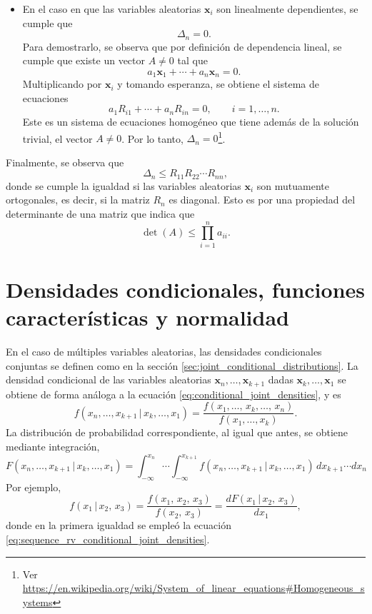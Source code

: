 \documentclass[a4paper]{report}
\newcommand{\x}{\mathbf{x}}
\begin{document}
\begin{itemize}
\begin{itemize}
  \item En el caso en que las variables aleatorias \(\x_i\) son linealmente dependientes, se cumple que
  \[
   \Delta_n=0.
  \]
  Para demostrarlo, se observa que por definición de dependencia lineal, se cumple que existe un vector \(A\neq0\) tal que
  \[
   a_1\x_1+\cdots+a_n\x_n=0.
  \]
  Multiplicando por \(\x_i\) y tomando esperanza, se obtiene el sistema de ecuaciones
  \[
   a_1R_{i1}+\cdots+a_nR_{in}=0,\qquad i=1,\dots,n.
  \]
  Este es un sistema de ecuaciones homogéneo que tiene además de la solución trivial, el vector \(A\neq0\). Por lo tanto, \(\Delta_n=0\)\footnote{Ver \url{https://en.wikipedia.org/wiki/System_of_linear_equations\#Homogeneous_systems}}. 
 \end{itemize}
\end{itemize}
Finalmente, se observa que
\[
 \Delta_n\leq R_{11}R_{22}\cdots R_{nn},
\]
donde se cumple la igualdad si las variables aleatorias \(\x_i\) son mutuamente ortogonales, es decir, si la matriz \(R_n\) es diagonal. Esto es por una propiedad del determinante de una matriz que indica que
\[
 \det(A)\leq\prod_{i=1}^na_{ii}.
\]

\section{Densidades condicionales, funciones características y normalidad}

En el caso de múltiples variables aleatorias, las densidades condicionales conjuntas se definen como en la sección \ref{sec:joint_conditional_distributions}. La densidad condicional de las variables aleatorias \(\x_n,\dots,\x_{k+1}\) dadas \(\x_k,\dots,\x_1\) se obtiene de forma análoga a la ecuación \ref{eq:conditional_joint_densities}, y es
\begin{equation}\label{eq:sequence_rv_conditional_joint_densities}
 f(x_n,\dots,x_{k+1}\,|\,x_{k},\dots,x_1)=\frac{f(x_1,\dots,\,x_{k},\dots,\,x_n)}{f(x_1,\dots,x_{k})}.
\end{equation}
La distribución de probabilidad correspondiente, al igual que antes, se obtiene mediante integración,
\small
\[
 F(x_n,\dots,x_{k+1}\,|\,x_{k},\dots,x_1)=\int_{-\infty}^{x_n}\cdots\int_{-\infty}^{x_{k+1}}f(x_n,\dots,x_{k+1}\,|\,x_{k},\dots,x_1)\,dx_{k+1}\cdots dx_n
\]
\normalsize
Por ejemplo,
\[
 f(x_1\,|\,x_2,\,x_3)=\frac{f(x_1,\,x_2,\,x_3)}{f(x_2,\,x_3)}=\frac{dF(x_1\,|\,x_2,\,x_3)}{dx_1},
\]
donde en la primera igualdad se empleó la ecuación \ref{eq:sequence_rv_conditional_joint_densities}.
\end{document}
